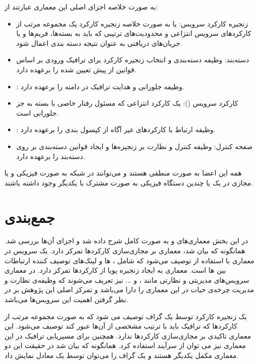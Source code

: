 به صورت خلاصه اجزای اصلی این معماری عبارتند از:
\begin{itemize}
    \item زنجیره کارکرد سرویس: یا به صورت خلاصه زنجیره کارکرد یک مجموعه مرتب از کارکردهای سرویس انتزاعی و محدودیت‌های ترتیبی که باید به بسته‌ها، فریم‌ها و یا جریان‌های دریافتی به عنوان نتیجه دسته بندی اعمال شود.
    \item دسته‌بند: وظیفه دسته‌بندی و انتخاب زنجیره کارکرد برای ترافیک ورودی بر اساس قوانین از پیش تعیین شده را برعهده دارد.
    \item {}: وظیفه جلورانی و هدایت ترافیک در دامنه  را برعهده دارد.
    \item کارکرد سرویس (): یک کارکرد انتزاعی که مسئول رفتار خاصی با بسته به جز جلورانی است.
    \item {}: وظیفه ارتباط با کارکردهای غیر آگاه از کپسول بندی  را برعهده دارد.
    \item صفحه کنترل: وظیفه کنترل و نظارت بر زنجیره‌ها و ایجاد قوانین دسته‌بندی بر روی دسته‌بند را برعهده دارد.
\end{itemize}
همه این اعضا به صورت منطقی هستند و می‌توانند در شبکه به صورت فیزیکی و یا مجازی در یک یا چندین دستگاه فیزیکی به صورت مشترک با یکدیگر وجود داشته باشند.

\section{جمع‌بندی}
در این بخش معماری‌های  و  به صورت کامل شرح داده شد و اجزای آن‌ها بررسی شد.
همانگونه که بیان شد، معماری  بر مجازی‌سازی کارکردها تمرکز دارد.
یک سرویس در معماری  با استفاده از  توصیف می‌شود که
شامل ، ‌ها و لینک‌های توصیف کننده ارتباطات بین ‌ها است.
معماری  به ایجاد زنجیره پویا از کارکردها تمرکز دارد.
در معماری  سرویس‌های مدیریتی و نظارتی مانند ،  و ... نیز تعریف می‌شوند که
وظیفه‌ی نظارت و مدیریت چرخه‌ی حیات در این معماری را دارا می‌باشد و تمرکز اصلی این پژوهش بر در نظر گرفتن اهمیت این سرویس‌ها می‌باشد.

یک زنجیره کارکرد توسط یک گراف  توصیف می شود که
به صورت مجموعه مرتب از کارکردها که ترافیک باید با ترتیب مشخصی از آن‌ها عبور کند توصیف می‌‌شود.
این معماری تاکیدی بر مجازی‌سازی کارکردها ندارد.
همچنین برای مسیریابی ترافیک در این معماری نیز می توان از سرآیند  استفاده کرد.
همانگونه که بیان شد در حقیقت این دو معماری مکمل یکدیگر هستند و
یک گراف  را می‌توان توسط یک  معادل نمایش داد.